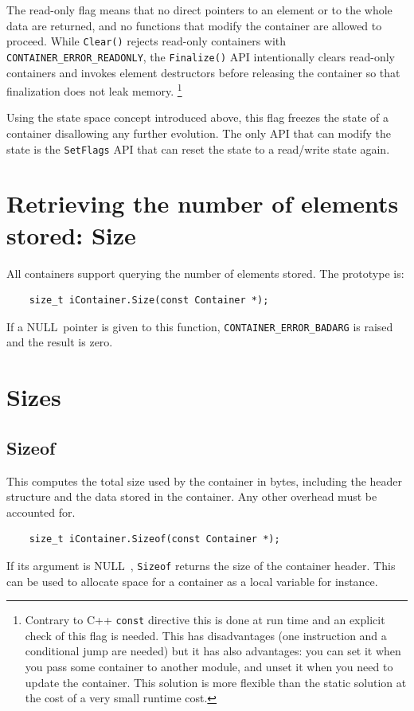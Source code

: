 \documentclass[12pt,a4paper,openany]{memoir} %
\newif\iftth
\newcommand{\Null}{{\iftth \ NULL \else \footnotesize NULL\  \fi}}
\begin{document}
The read-only flag means that no direct pointers to an element or to the whole data are returned, and no functions that modify the container are allowed to proceed. While \verb,Clear(), rejects read-only containers with \verb,CONTAINER_ERROR_READONLY,, the \verb,Finalize(), API intentionally clears read-only containers and invokes element destructors before releasing the container so that finalization does not leak memory.
\footnote{Contrary to C++ \texttt{const} directive this is done at run time and an explicit check of this flag is needed. This has disadvantages 
(one instruction and a conditional jump are needed) but it has also advantages: you can set it when you pass some container to another module, and unset it when you need to update the container. This solution is more flexible than the static solution at the cost of a very small runtime cost.}

Using the state space concept introduced above, this flag freezes the state of a container disallowing any further evolution. The only API that
can modify the state is the \verb,SetFlags, API that can reset the state to a read/write state again.
\section{Retrieving the number of elements stored: Size}
All containers support querying the number of elements stored. The prototype is:
\begin{verbatim}
    size_t iContainer.Size(const Container *);
\end{verbatim}
If a \Null pointer is given to this function, \texttt{CONTAINER\_ERROR\_BADARG} is raised and the result is zero.
\section{Sizes}
\subsection{Sizeof}
This computes the total size used by the container in bytes, including the header structure and the data stored in the container. Any other overhead 
must be accounted for.
\begin{verbatim}
    size_t iContainer.Sizeof(const Container *);
\end{verbatim}

If its argument is \Null, \texttt{Sizeof} returns the size of the container header. This can be used to allocate space for a container as a local variable for instance.
\end{document}
